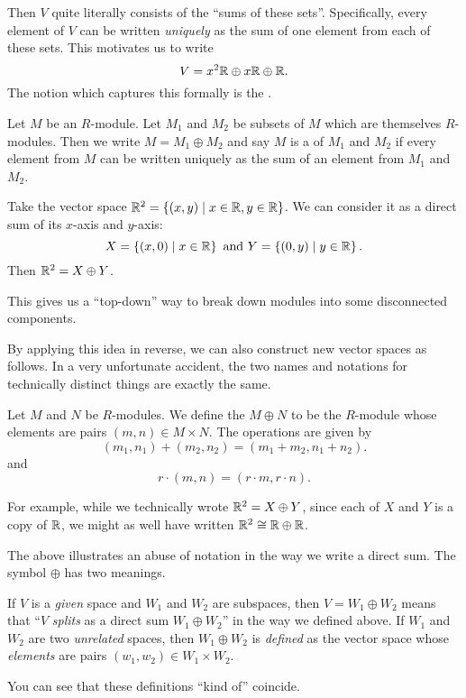Then $V$ quite literally consists of the ``sums of these sets''.
Specifically, every element of $V$ can be written \emph{uniquely}
as the sum of one element from each of these sets.
This motivates us to write
\[ V = x^2\mathbb R \oplus x\mathbb R \oplus \mathbb R. \]
The notion which captures this formally is the .

\begin{definition}
	\label{def:vector_space_direct_sum}
	Let $M$ be an $R$-module.
	Let $M_1$ and $M_2$ be subsets of $M$ which are themselves $R$-modules.
	Then we write $M = M_1 \oplus M_2$ and say $M$ is a 
	of $M_1$ and $M_2$
	if every element from $M$ can be written uniquely as the sum
	of an element from $M_1$ and $M_2$.
\end{definition}
\begin{example}
	Take the vector space $\mathbb R^2 = \left\{ (x,y) \mid x \in \mathbb R, y \in \mathbb R \right\}$.
	We can consider it as a direct sum of its $x$-axis and $y$-axis:
	\[ X = \left\{ (x,0) \mid x \in \mathbb R  \right\}
		\text{ and }
		Y = \left\{ (0,y) \mid y \in \mathbb R \right\}. \]
	Then $\mathbb R^2 = X \oplus Y$.
\end{example}

This gives us a ``top-down'' way to break down modules
into some disconnected components.

By applying this idea in reverse, we can also construct
new vector spaces as follows.
In a very unfortunate accident, the two names and notations for technically
distinct things are exactly the same.
\begin{definition}
	Let $M$ and $N$ be $R$-modules.
	We define the  $M \oplus N$
	to be the $R$-module whose elements are pairs $(m,n) \in M \times N$.
	The operations are given by
	\[ (m_1, n_1) + (m_2, n_2) = (m_1+m_2, n_1+n_2). \]
	and
	\[ r \cdot (m, n) = (r \cdot m, r \cdot n). \]
\end{definition}

For example, while we technically wrote $\mathbb R^2 = X \oplus Y$,
since each of $X$ and $Y$ is a copy of $\mathbb R$,
we might as well have written $\mathbb R^2 \cong \mathbb R \oplus \mathbb R$.

\begin{abuse}
	The above illustrates an abuse of notation in the way we write a direct sum. The symbol $\oplus$ has two meanings.
	\begin{itemize}
		\ii If $V$ is a \emph{given} space and $W_1$ and $W_2$ are subspaces, then $V = W_1 \oplus W_2$ means that ``$V$ \emph{splits} as a direct sum $W_1 \oplus W_2$'' in the way we defined above.
		\ii If $W_1$ and $W_2$ are two \emph{unrelated} spaces, then $W_1 \oplus W_2$ is \emph{defined} as the vector space whose \emph{elements} are pairs $(w_1, w_2) \in W_1 \times W_2$.
	\end{itemize}
	You can see that these definitions ``kind of'' coincide.
\end{abuse}

